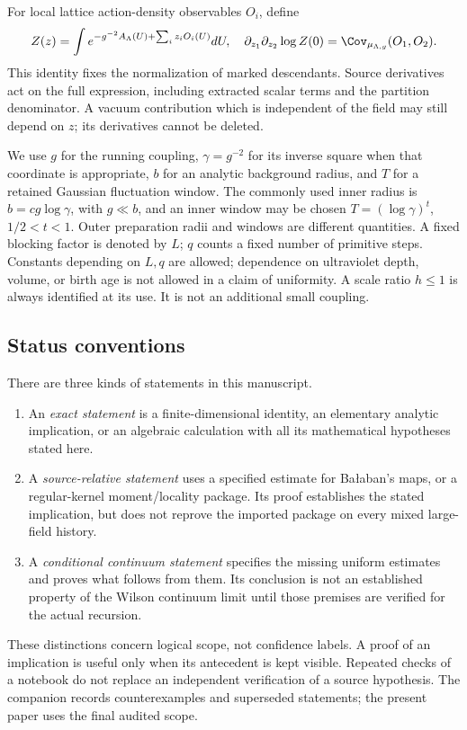 For local lattice action-density observables \(O_i\), define
\begin{equation}
 Z(z)=\int e^{-g^{-2}A_\Lambda(U)+\sum_i z_iO_i(U)}dU,
 \quad \partial_{z_1}\partial_{z_2}\log Z(0)
       =\Cov_{\mu_{\Lambda,g}}(O_1,O_2). \label{eq:sources}
\end{equation}
This identity fixes the normalization of marked descendants. Source
derivatives act on the full expression, including extracted scalar terms
and the partition denominator. A vacuum contribution which is independent
of the field may still depend on \(z\); its derivatives cannot be deleted.

We use \(g\) for the running coupling, \(\gamma=g^{-2}\) for its inverse
square when that coordinate is appropriate, \(b\) for an analytic
background radius, and \(T\) for a retained Gaussian fluctuation window.
The commonly used inner radius is \(b=cg\log\gamma\), with
\(g\ll b\), and an inner window may be chosen
\(T=(\log\gamma)^t\), \(1/2<t<1\). Outer preparation radii and windows
are different quantities. A fixed blocking factor is denoted by \(L\);
\(q\) counts a fixed number of primitive steps. Constants depending on
\(L,q\) are allowed; dependence on ultraviolet depth, volume, or birth age
is not allowed in a claim of uniformity. A scale ratio \(h\leq1\) is
always identified at its use. It is not an additional small coupling.

\subsection{Status conventions}

There are three kinds of statements in this manuscript.
\begin{enumerate}
 \item An \emph{exact statement} is a finite-dimensional identity,
 an elementary analytic implication, or an algebraic calculation with
 all its mathematical hypotheses stated here.
 \item A \emph{source-relative statement} uses a specified estimate for
 Ba{\l}aban's maps, or a regular-kernel moment/locality package. Its proof
 establishes the stated implication, but does not reprove the imported
 package on every mixed large-field history.
 \item A \emph{conditional continuum statement} specifies the missing
 uniform estimates and proves what follows from them. Its conclusion
 is not an established property of the Wilson continuum limit until
 those premises are verified for the actual recursion.
\end{enumerate}
These distinctions concern logical scope, not confidence labels. A proof
of an implication is useful only when its antecedent is kept visible.
Repeated checks of a notebook do not replace an independent verification
of a source hypothesis. The companion records counterexamples and
superseded statements; the present paper uses the final audited scope.

